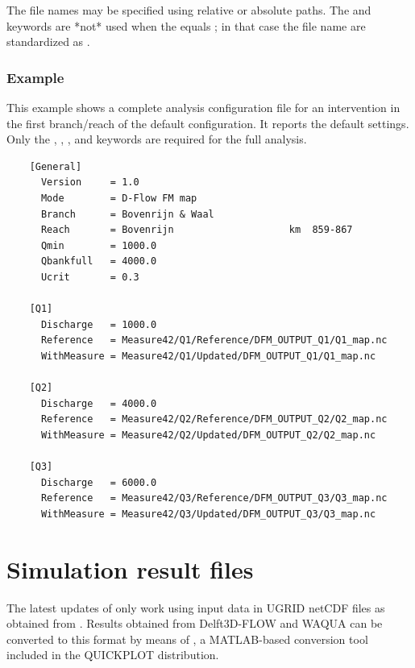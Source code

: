 The file names may be specified using relative or absolute paths.
The  and  keywords are *not* used when the  equals ; in that case the file name are standardized as .

\subsubsection*{Example}

This example shows a complete analysis configuration file for an intervention in the first branch/reach of the default  configuration.
It reports the default settings.
Only the , , ,  and  keywords are required for the full analysis.

\begin{Verbatim}
    [General]
      Version     = 1.0
      Mode        = D-Flow FM map
      Branch      = Bovenrijn & Waal
      Reach       = Bovenrijn                    km  859-867
      Qmin        = 1000.0
      Qbankfull   = 4000.0
      Ucrit       = 0.3
    
    [Q1]
      Discharge   = 1000.0
      Reference   = Measure42/Q1/Reference/DFM_OUTPUT_Q1/Q1_map.nc
      WithMeasure = Measure42/Q1/Updated/DFM_OUTPUT_Q1/Q1_map.nc
    
    [Q2]
      Discharge   = 4000.0
      Reference   = Measure42/Q2/Reference/DFM_OUTPUT_Q2/Q2_map.nc
      WithMeasure = Measure42/Q2/Updated/DFM_OUTPUT_Q2/Q2_map.nc
    
    [Q3]
      Discharge   = 6000.0
      Reference   = Measure42/Q3/Reference/DFM_OUTPUT_Q3/Q3_map.nc
      WithMeasure = Measure42/Q3/Updated/DFM_OUTPUT_Q3/Q3_map.nc
\end{Verbatim}


\section{Simulation result files}

The latest updates of \dfastmi only work using input data in UGRID netCDF files as obtained from \dflowfm.
Results obtained from Delft3D-FLOW and WAQUA can be converted to this format by means of , a MATLAB-based conversion tool included in the QUICKPLOT distribution.

